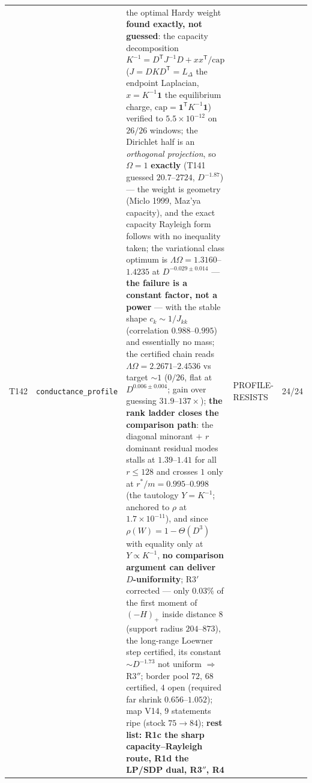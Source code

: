\documentclass[11pt,a4paper]{article}
\begin{document}
{\begin{xltabular}{\linewidth}{@{}p{0.95cm} >{\raggedright\arraybackslash}p{3.1cm} Y >{\raggedright\scriptsize\arraybackslash}p{3.35cm} p{1.15cm}@{}}
T142 & \texttt{\scriptsize conductance\_\allowbreak profile} & the optimal Hardy weight \textbf{found exactly, not guessed}: the capacity decomposition $K^{-1}=D^{\mathsf T}J^{-1}D+xx^{\mathsf T}/\mathrm{cap}$ ($J=DKD^{\mathsf T}=L_\Delta$ the endpoint Laplacian, $x=K^{-1}\mathbf 1$ the equilibrium charge, $\mathrm{cap}=\mathbf 1^{\mathsf T}K^{-1}\mathbf 1$) verified to $5.5\times10^{-12}$ on $26/26$ windows; the Dirichlet half is an \emph{orthogonal projection}, so $\Omega=1$ \textbf{exactly} (T141 guessed $20.7$--$2724$, $D^{-1.87}$) --- the weight is geometry (Miclo 1999, Maz'ya capacity), and the exact capacity Rayleigh form follows with no inequality taken; the variational class optimum is $\Lambda\Omega=1.3160$--$1.4235$ at $D^{-0.029\pm0.014}$ --- \textbf{the failure is a constant factor, not a power} --- with the stable shape $c_k\sim1/J_{kk}$ (correlation $0.988$--$0.995$) and essentially no mass; the certified chain reads $\Lambda\Omega=2.2671$--$2.4536$ vs target ${\sim}1$ ($0/26$, flat at $D^{0.006\pm0.004}$; gain over guessing $31.9$--$137\times$); \textbf{the rank ladder closes the comparison path}: the diagonal minorant $+$ $r$ dominant residual modes stalls at $1.39$--$1.41$ for all $r\le128$ and crosses $1$ only at $r^*/m=0.995$--$0.998$ (the tautology $Y=K^{-1}$; anchored to $\rho$ at $1.7\times10^{-11}$), and since $\rho(W)=1-\Theta(D^3)$ with equality only at $Y\propto K^{-1}$, \textbf{no comparison argument can deliver $D$-uniformity}; R3$'$ corrected --- only $0.03\%$ of the first moment of $(-H)_+$ inside distance $8$ (support radius $204$--$873$), the long-range Loewner step certified, its constant $\sim D^{-1.73}$ not uniform $\Rightarrow$ R3$''$; border pool $72$, $68$ certified, $4$ open (required far shrink $0.656$--$1.052$); map V14, $9$ statements ripe (stock $75\to84$); \textbf{rest list: R1c the sharp capacity--Rayleigh route, R1d the LP/SDP dual, R3$''$, R4} & PROFILE-RESISTS & 24/24\\

\end{xltabular}}
\end{document}

